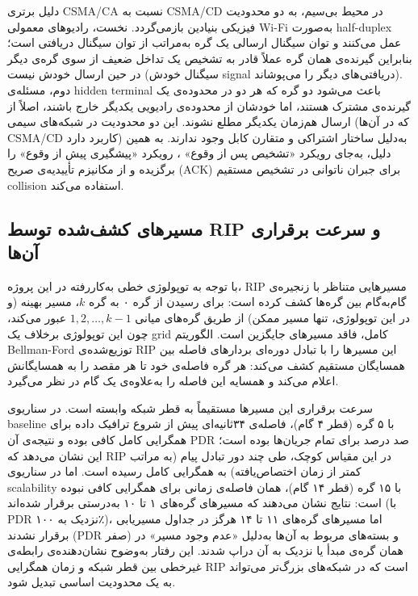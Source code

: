 \documentclass{article}
\begin{document}
	دلیل برتری CSMA/CA نسبت به CSMA/CD در محیط بی‌سیم، به دو محدودیت فیزیکی بنیادین بازمی‌گردد. نخست، رادیوهای معمولی Wi-Fi به‌صورت half-duplex عمل می‌کنند و توان سیگنال ارسالی یک گره به‌مراتب از توان سیگنال دریافتی است؛ بنابراین گیرنده‌ی همان گره عملاً قادر به تشخیص یک تداخل ضعیف از سوی گره‌ی دیگر در حین ارسال خودش نیست (سیگنال خودش signal دریافتی‌های دیگر را می‌پوشاند). دوم، مسئله‌ی hidden terminal باعث می‌شود دو گره که هر دو در محدوده‌ی یک گیرنده‌ی مشترک هستند، اما خودشان از محدوده‌ی رادیویی یکدیگر خارج باشند، اصلاً از ارسال هم‌زمان یکدیگر مطلع نشوند. این دو محدودیت در شبکه‌های سیمی (که در آن‌ها CSMA/CD کاربرد دارد) به‌دلیل ساختار اشتراکی و متقارن کابل وجود ندارند. به همین دلیل،  به‌جای رویکرد «تشخیص پس از وقوع» 
	،
	 رویکرد «پیشگیری پیش از وقوع» 
	 را برگزیده و از مکانیزم تأییدیه‌ی صریح (ACK) برای جبران ناتوانی در تشخیص مستقیم collision استفاده می‌کند.
	
	\subsection{مسیرهای کشف‌شده توسط RIP و سرعت برقراری آن‌ها}
	
	با توجه به توپولوژی خطی به‌کاررفته در این پروژه، RIP مسیرهایی متناظر با زنجیره‌ی گام‌به‌گام بین گره‌ها کشف کرده است: برای رسیدن از گره ۰ به گره $k$، مسیر بهینه (و در این توپولوژی، تنها مسیر ممکن) از طریق گره‌های میانی $1, 2, \dots, k-1$ عبور می‌کند، چون این توپولوژی برخلاف یک grid کامل، فاقد مسیرهای جایگزین 
	است. الگوریتم Bellman-Ford توزیع‌شده‌ی RIP این مسیرها را با تبادل دوره‌ای بردارهای فاصله بین همسایگان مستقیم کشف می‌کند: هر گره فاصله‌ی خود تا هر مقصد را به همسایگانش اعلام می‌کند و همسایه این فاصله را به‌علاوه‌ی یک گام در نظر می‌گیرد.
	
	سرعت برقراری این مسیرها مستقیماً به قطر شبکه وابسته است. در سناریوی baseline با ۵ گره (قطر ۴ گام)، فاصله‌ی ۳۴ثانیه‌ای پیش از شروع ترافیک داده برای همگرایی کامل کافی بوده و نتیجه‌ی آن PDR صد درصد برای تمام جریان‌ها بوده است؛ این نشان می‌دهد که RIP در این مقیاس کوچک، طی چند دور تبادل پیام (به مراتب کمتر از زمان اختصاص‌یافته) به همگرایی کامل رسیده است. اما در سناریوی scalability با ۱۵ گره (قطر ۱۴ گام)، همان فاصله‌ی زمانی برای همگرایی کافی نبوده است: نتایج نشان می‌دهند که مسیرهای گره‌های ۱ تا ۱۰ به‌درستی برقرار شده‌اند (با PDR نزدیک به ۱۰۰٪)، اما مسیرهای گره‌های ۱۱ تا ۱۴ هرگز در جداول مسیریابی برقرار نشدند (PDR صفر) و بسته‌های مربوط به آن‌ها به‌دلیل «عدم وجود مسیر» در همان گره‌ی مبدأ یا نزدیک به آن دراپ شدند. این رفتار به‌وضوح نشان‌دهنده‌ی رابطه‌ی غیرخطی بین قطر شبکه و زمان همگرایی RIP است که در شبکه‌های بزرگ‌تر می‌تواند به یک محدودیت اساسی تبدیل شود.
	
\end{document}

